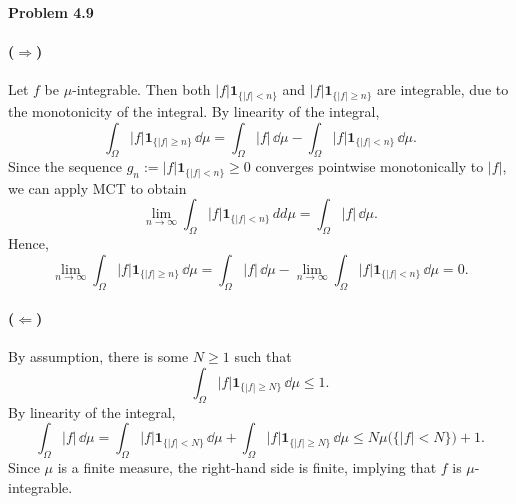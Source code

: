 \documentclass{lecturenotes}
\begin{document}
\textbf{Problem 4.9}

\paragraph{($\Rightarrow$)} Let $f$ be $\mu$-integrable. Then both $|f|\mathbf{1}_{\{|f|<n\}}$ and $|f|\mathbf{1}_{\{|f|\ge n\}}$ are integrable, due to the monotonicity of the integral. By linearity of the integral,
\[
	\int_\Omega |f|\mathbf{1}_{\{|f|\ge n\}}\,\dd\mu = \int_\Omega |f|\,\dd\mu - \int_\Omega |f|\mathbf{1}_{\{|f|< n\}}\,\dd\mu.
\]
Since the sequence $g_n:= |f|\mathbf{1}_{\{|f|< n\}}\ge 0$ converges pointwise monotonically to $|f|$, we can apply MCT to obtain
\[
	\lim_{n\to\infty} \int_\Omega |f|\mathbf{1}_{\{|f|< n\}}\,dd\mu = \int_\Omega |f|\,\dd\mu.
\]
Hence,
\[	
	\lim_{n\to\infty}\int_\Omega |f|\mathbf{1}_{\{|f|\ge n\}}\,\dd\mu = \int_\Omega |f|\,\dd\mu - \lim_{n\to\infty}\int_\Omega |f|\mathbf{1}_{\{|f|< n\}}\,\dd\mu = 0.
\]

\paragraph{($\Leftarrow$)} By assumption, there is some $N\ge 1$ such that
\[
	\int_\Omega |f|\mathbf{1}_{\{|f|\ge N\}}\,\dd\mu \le 1.
\]
By linearity of the integral,
\[
	\int_\Omega |f|\,\dd\mu = \int_\Omega |f|\mathbf{1}_{\{|f|< N\}}\,\dd\mu +\int_\Omega |f|\mathbf{1}_{\{|f|\ge N\}}\,\dd\mu \le N \mu\bigl(\{|f|< N\}\bigr) + 1.
\]
Since $\mu$ is a finite measure, the right-hand side is finite, implying that $f$ is $\mu$-integrable.

\bigskip
\end{document}

